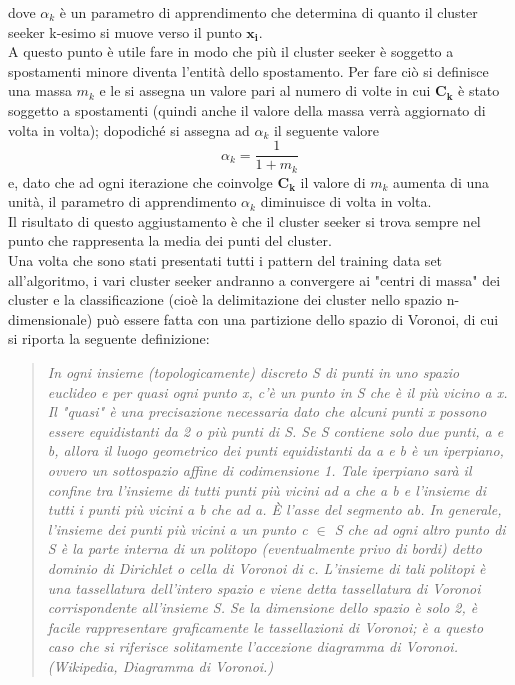 dove $\alpha_k$ è un parametro di apprendimento che determina di quanto il cluster seeker k-esimo si muove verso il punto $\textbf{x}_\textbf{i}$. \\
A questo punto è utile fare in modo che più il cluster seeker è soggetto a spostamenti minore diventa l'entità dello spostamento. Per fare ciò si definisce una massa $m_k$ e le si assegna un valore pari al numero di volte in cui $\textbf{C}_\textbf{k}$ è stato soggetto a spostamenti (quindi anche il valore della massa verrà aggiornato di volta in volta); dopodiché si assegna ad $\alpha_k$ il seguente valore
\begin{equation}
\alpha_k = \frac{1}{1 + m_k}
\end{equation} 
e, dato che ad ogni iterazione che coinvolge $\textbf{C}_\textbf{k}$ il valore di $m_k$ aumenta di una unità, il parametro di apprendimento $\alpha_k$ diminuisce di volta in volta. \\
Il risultato di questo aggiustamento è che il cluster seeker si trova sempre nel punto che rappresenta la media dei punti del cluster. \\
Una volta che sono stati presentati tutti i pattern del training data set all'algoritmo, i vari cluster seeker andranno a convergere ai "centri di massa" dei cluster e la classificazione (cioè la delimitazione dei cluster nello spazio n-dimensionale) può essere fatta con una partizione dello spazio di Voronoi, di cui si riporta la seguente definizione:
\begin{quotation} \small
	\textit{In ogni insieme (topologicamente) discreto S di punti in uno spazio euclideo e per quasi ogni punto x, c'è un punto in S che è il più vicino a x. Il "quasi" è una precisazione necessaria dato che alcuni punti x possono essere equidistanti da 2 o più punti di S.
		Se S contiene solo due punti, a e b, allora il luogo geometrico dei punti equidistanti da a e b è un iperpiano, ovvero un sottospazio affine di codimensione 1. Tale iperpiano sarà il confine tra l'insieme di tutti punti più vicini ad a che a b e l'insieme di tutti i punti più vicini a b che ad a. È l'asse del segmento ab.
		In generale, l'insieme dei punti più vicini a un punto c $\in$ S che ad ogni altro punto di S è la parte interna di un politopo (eventualmente privo di bordi) detto dominio di Dirichlet o cella di Voronoi di c. L'insieme di tali politopi è una tassellatura dell'intero spazio e viene detta tassellatura di Voronoi corrispondente all'insieme S. Se la dimensione dello spazio è solo 2, è facile rappresentare graficamente le tassellazioni di Voronoi; è a questo caso che si riferisce solitamente l'accezione diagramma di Voronoi. \\
		(Wikipedia, Diagramma di Voronoi.)} 
\end{quotation}

